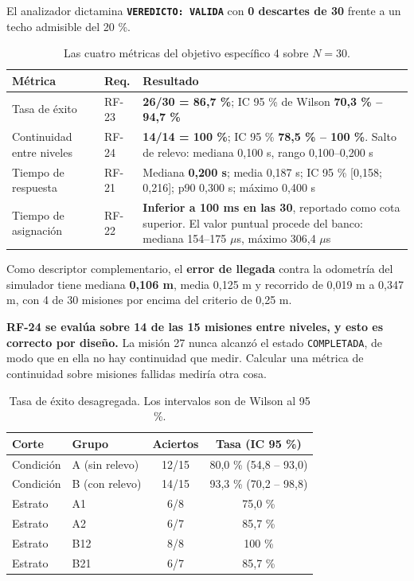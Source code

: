\documentclass[12pt,letterpaper]{article}
\begin{document}
El analizador dictamina \textbf{\texttt{VEREDICTO: VALIDA}} con \textbf{0 descartes de 30} frente a un techo admisible del 20 \%.

\begin{table}[H]
    \centering
    \small
    \caption{Las cuatro métricas del objetivo específico 4 sobre $N = 30$.}
    \label{tab:metricas}
    \begin{tabular}{@{}llp{6.8cm}@{}}
        \toprule
        \textbf{Métrica} & \textbf{Req.} & \textbf{Resultado} \\ \midrule
        Tasa de éxito & RF-23 & \textbf{26/30 = 86,7 \%}; IC 95 \% de Wilson \textbf{70,3 \% -- 94,7 \%} \\ \addlinespace
        Continuidad entre niveles & RF-24 & \textbf{14/14 = 100 \%}; IC 95 \% \textbf{78,5 \% -- 100 \%}. Salto de relevo: mediana 0,100 s, rango 0,100--0,200 s \\ \addlinespace
        Tiempo de respuesta & RF-21 & Mediana \textbf{0,200 s}; media 0,187 s; IC 95 \% [0,158; 0,216]; p90 0,300 s; máximo 0,400 s \\ \addlinespace
        Tiempo de asignación & RF-22 & \textbf{Inferior a 100 ms en las 30}, reportado como cota superior. El valor puntual procede del banco: mediana 154--175 $\mu$s, máximo 306,4 $\mu$s \\ \bottomrule
    \end{tabular}
\end{table}

Como descriptor complementario, el \textbf{error de llegada} contra la odometría del simulador tiene mediana \textbf{0,106 m}, media 0,125 m y recorrido de 0,019 m a 0,347 m, con 4 de 30 misiones por encima del criterio de 0,25 m.

\textbf{RF-24 se evalúa sobre 14 de las 15 misiones entre niveles, y esto es correcto por diseño.} La misión 27 nunca alcanzó el estado \texttt{COMPLETADA}, de modo que en ella no hay continuidad que medir. Calcular una métrica de continuidad sobre misiones fallidas mediría otra cosa.

\begin{table}[H]
    \centering
    \small
    \caption{Tasa de éxito desagregada. Los intervalos son de Wilson al 95 \%.}
    \label{tab:desagregada}
    \begin{tabular}{@{}llcc@{}}
        \toprule
        \textbf{Corte} & \textbf{Grupo} & \textbf{Aciertos} & \textbf{Tasa (IC 95 \%)} \\ \midrule
        Condición & A (sin relevo) & 12/15 & 80,0 \% (54,8 -- 93,0) \\
        Condición & B (con relevo) & 14/15 & 93,3 \% (70,2 -- 98,8) \\ \addlinespace
        Estrato & A1 & 6/8 & 75,0 \% \\
        Estrato & A2 & 6/7 & 85,7 \% \\
        Estrato & B12 & 8/8 & 100 \% \\
        Estrato & B21 & 6/7 & 85,7 \% \\ \bottomrule
    \end{tabular}
\end{table}
\end{document}
